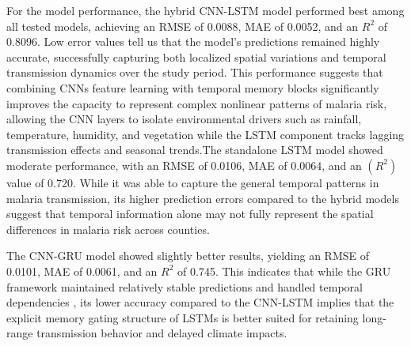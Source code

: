     For the model performance, the hybrid CNN-LSTM model performed best among all tested models, achieving an RMSE of 0.0088, MAE of 0.0052, and an $R^2$ of 0.8096. Low error values tell us that the model's predictions remained highly accurate, successfully capturing both localized spatial variations and temporal transmission dynamics over the study period. This performance suggests that combining CNNs feature learning with temporal memory blocks significantly improves the capacity to represent complex nonlinear patterns of malaria risk, allowing the CNN layers to isolate environmental drivers such as rainfall, temperature, humidity, and vegetation while the LSTM component tracks lagging transmission effects and seasonal trends.The standalone LSTM model showed moderate performance, with an RMSE of 0.0106, MAE of 0.0064, and an $(R^2)$ value of 0.720. While it was able to capture the general temporal patterns in malaria transmission, its higher prediction errors compared to the hybrid models suggest that temporal information alone may not fully represent the spatial differences in malaria risk across counties.
    
    The CNN-GRU model showed slightly better results, yielding an RMSE of 0.0101, MAE of 0.0061, and an $R^2$ of 0.745. This indicates that while the GRU framework maintained relatively stable predictions and handled temporal dependencies , its lower accuracy compared to the CNN-LSTM implies that the explicit memory gating structure of LSTMs is better suited for retaining long-range transmission behavior and delayed climate impacts.
    
